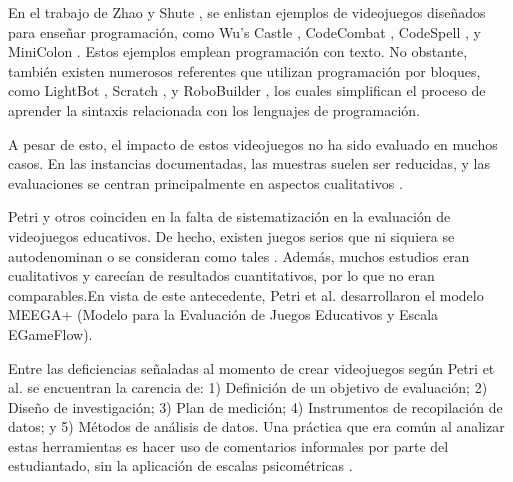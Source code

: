 
En el trabajo de Zhao y Shute \cite{video_game_foster_computational_thinking}, se enlistan ejemplos de videojuegos diseñados para enseñar programación, como Wu's Castle \cite{wuscastle}, CodeCombat \cite{CodeCombat}, CodeSpell \cite{codespells}, y MiniColon \cite{minicolon}. Estos ejemplos emplean programación con texto. No obstante, también existen numerosos referentes que utilizan programación por bloques, como LightBot \cite{LightBot}, Scratch \cite{ scratch, maloney2010scratch}, y RoboBuilder \cite{RoboBuilder}, los cuales simplifican el proceso de aprender la sintaxis relacionada con los lenguajes de programación.

A pesar de esto, el impacto de estos videojuegos no ha sido evaluado en muchos casos. En las instancias documentadas, las muestras suelen ser reducidas, y las evaluaciones se centran principalmente en aspectos cualitativos \cite{video_game_foster_computational_thinking, effectiveness_gbl}.

Petri y otros \cite{meegaplus} coinciden en la falta de sistematización en la evaluación de videojuegos educativos. De hecho, existen juegos serios que ni siquiera se autodenominan o se consideran como tales \cite{evaluation_of_games_for_teaching_cs}. Además, muchos estudios eran cualitativos y carecían de resultados cuantitativos, por lo que no eran comparables.En vista de este antecedente, Petri et al. \cite{meegaplus} desarrollaron el modelo MEEGA+ (Modelo para la Evaluación de Juegos Educativos y Escala EGameFlow).

Entre las deficiencias señaladas al momento de crear videojuegos según Petri et al. \cite{meegaplus} se encuentran la carencia de: 1) Definición de un objetivo de evaluación; 2) Diseño de investigación; 3) Plan de medición; 4) Instrumentos de recopilación de datos; y 5) Métodos de análisis de datos. Una práctica que era común al analizar estas herramientas es hacer uso de comentarios informales por parte del estudiantado, sin la aplicación de escalas psicométricas \cite{meegaplus}.
